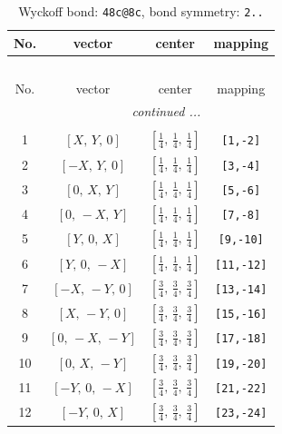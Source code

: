 \documentclass[fleqn,8pt]{jsarticle}
\begin{document}
\begin{longtable}{cccc}
\caption{Wyckoff bond: {\tt 48c@8c}, bond symmetry: {\tt 2..}}
 \\
 \hline \hline
No. & vector & center & mapping \\ \hline \endfirsthead

\multicolumn{3}{l}{\tablename\ \thetable{}} \\
 \hline \hline
No. & vector & center & mapping \\ \hline \endhead

 \hline \hline
\multicolumn{3}{r}{\footnotesize\it continued ...} \\ \endfoot

 \hline \hline
\multicolumn{3}{r}{} \\ \endlastfoot

1 & $\left[ X,\, Y,\, 0 \right]$ & $\left[ \frac{1}{4},\, \frac{1}{4},\, \frac{1}{4} \right]$ & {\tt [1,-2]} \\ \hline
2 & $\left[ - X,\, Y,\, 0 \right]$ & $\left[ \frac{1}{4},\, \frac{1}{4},\, \frac{1}{4} \right]$ & {\tt [3,-4]} \\ \hline
3 & $\left[ 0,\, X,\, Y \right]$ & $\left[ \frac{1}{4},\, \frac{1}{4},\, \frac{1}{4} \right]$ & {\tt [5,-6]} \\ \hline
4 & $\left[ 0,\, - X,\, Y \right]$ & $\left[ \frac{1}{4},\, \frac{1}{4},\, \frac{1}{4} \right]$ & {\tt [7,-8]} \\ \hline
5 & $\left[ Y,\, 0,\, X \right]$ & $\left[ \frac{1}{4},\, \frac{1}{4},\, \frac{1}{4} \right]$ & {\tt [9,-10]} \\ \hline
6 & $\left[ Y,\, 0,\, - X \right]$ & $\left[ \frac{1}{4},\, \frac{1}{4},\, \frac{1}{4} \right]$ & {\tt [11,-12]} \\ \hline
7 & $\left[ - X,\, - Y,\, 0 \right]$ & $\left[ \frac{3}{4},\, \frac{3}{4},\, \frac{3}{4} \right]$ & {\tt [13,-14]} \\ \hline
8 & $\left[ X,\, - Y,\, 0 \right]$ & $\left[ \frac{3}{4},\, \frac{3}{4},\, \frac{3}{4} \right]$ & {\tt [15,-16]} \\ \hline
9 & $\left[ 0,\, - X,\, - Y \right]$ & $\left[ \frac{3}{4},\, \frac{3}{4},\, \frac{3}{4} \right]$ & {\tt [17,-18]} \\ \hline
10 & $\left[ 0,\, X,\, - Y \right]$ & $\left[ \frac{3}{4},\, \frac{3}{4},\, \frac{3}{4} \right]$ & {\tt [19,-20]} \\ \hline
11 & $\left[ - Y,\, 0,\, - X \right]$ & $\left[ \frac{3}{4},\, \frac{3}{4},\, \frac{3}{4} \right]$ & {\tt [21,-22]} \\ \hline
12 & $\left[ - Y,\, 0,\, X \right]$ & $\left[ \frac{3}{4},\, \frac{3}{4},\, \frac{3}{4} \right]$ & {\tt [23,-24]} \\
\end{longtable}
\end{document}
